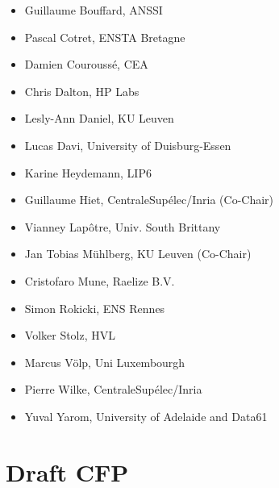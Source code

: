 \documentclass[a4paper,11pt]{article}
\begin{document}

\begin{itemize}
    \item Guillaume Bouffard, ANSSI
    \item Pascal Cotret, ENSTA Bretagne
    \item Damien Couroussé, CEA
    \item Chris Dalton, HP Labs
    \item{Lesly-Ann Daniel, KU Leuven}
    \item Lucas Davi, University of Duisburg-Essen
    \item Karine Heydemann, LIP6
    \item Guillaume Hiet, CentraleSupélec/Inria (Co-Chair)
    \item Vianney Lapôtre, Univ. South Brittany
    \item Jan Tobias Mühlberg, KU Leuven (Co-Chair)
    \item Cristofaro Mune, Raelize B.V.
    \item Simon Rokicki, ENS Rennes
    \item Volker Stolz, HVL
    \item{Marcus V\"olp, Uni Luxembourgh}
    \item Pierre Wilke, CentraleSupélec/Inria
    \item Yuval Yarom, University of Adelaide and Data61
\end{itemize}


\section{Draft CFP}
%

\end{document}
